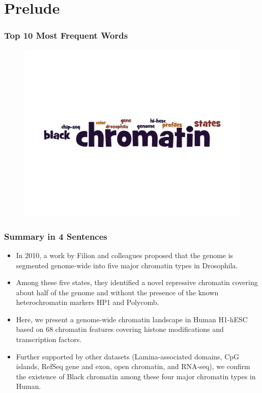 \documentclass{beamer}
\begin{document}
\section{Prelude}
\begin{frame}
	\frametitle{Top 10  Most Frequent Words}
	\pause
	\begin{figure}
   			\includegraphics[width=1\textwidth]{figs/Top10.pdf}
 	\end{figure}
\end{frame}

\begin{frame}
	\frametitle{Summary in 4 Sentences}
	\pause
	\begin{itemize}[<+->]
		\item In 2010, a work by Filion and colleagues proposed that the genome is segmented genome-wide into five major chromatin types in Drosophila. 
		\item Among these five states, they identified a novel repressive chromatin covering about half of the genome and without the presence of the known heterochromatin markers HP1 and Polycomb. 
		\item Here, we present a genome-wide chromatin landscape in Human H1-hESC based on 68 chromatin features covering histone modifications and transcription factors. 
		\item Further supported by other datasets (Lamina-associated domains, CpG islands, RefSeq gene and exon, open chromatin, and RNA-seq), we confirm the existence of Black chromatin among these four major chromatin types in Human.
	\end{itemize}
\end{frame}
\end{document}
